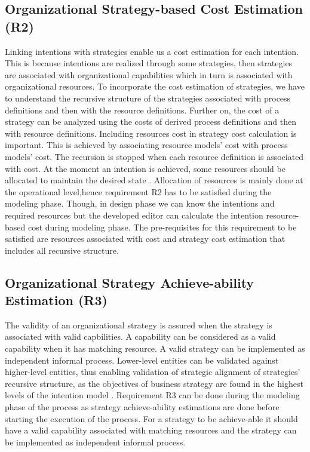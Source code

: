 \subsection{Organizational Strategy-based Cost Estimation (R2)}
Linking intentions with strategies enable us a cost estimation for each intention. This is because intentions are realized through some strategies, then strategies are associated with organizational capabilities which in turn is associated with organizational resources. To incorporate the cost estimation of strategies, we have to understand the recursive structure of the strategies associated with process definitions and then with the resource definitions. Further on, the cost of a strategy can be analyzed using the costs of derived process definitions and then with resource definitions. Including resources cost in strategy cost calculation is important. This is achieved by associating resource models' cost with process models' cost. The recursion is stopped when each resource definition is associated with cost. At the moment an intention is achieved, some resources should be allocated to maintain the desired state \cite{Mandic2010}. Allocation of resources is mainly done at the operational level,hence requirement R2 has to be satisfied during the modeling phase. Though, in design phase we can know the intentions and required resources but the developed editor can calculate the intention resource-based cost during modeling phase. The pre-requisites for this requirement to be satisfied are resources associated with cost and strategy cost estimation that includes all recursive structure.

\subsection{Organizational Strategy Achieve-ability Estimation (R3)}
 The validity of an organizational strategy is assured when the strategy is associated with valid capbilities. A capability can be considered as a valid capability when it has matching resource. A valid strategy can be implemented as independent informal process. Lower-level entities can be validated against higher-level entities, thus enabling validation of strategic alignment of strategies' recursive structure, as the objectives of business strategy are found in the highest levels of the intention model \cite{Bleistein2006}. Requirement R3  can be done during the modeling phase of the process as strategy achieve-ability estimations are done before starting the execution of the process. For a strategy to be achieve-able it should have a valid capability associated with matching resources and the strategy can be implemented as independent informal process.
 
